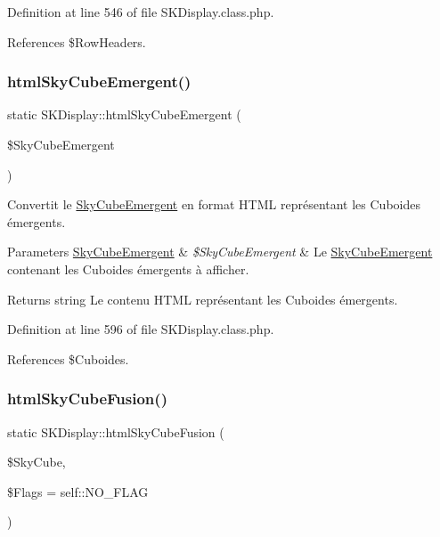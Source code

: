 Definition at line 546 of file S\+K\+Display.\+class.\+php.



References \$\+Row\+Headers.

\mbox{\label{class_s_k_display_a14e07320ee77ed55eff754b554411762}} 
\subsubsection{\texorpdfstring{html\+Sky\+Cube\+Emergent()}{htmlSkyCubeEmergent()}}
{\footnotesize\ttfamily static S\+K\+Display\+::html\+Sky\+Cube\+Emergent (\begin{DoxyParamCaption}\item[{}]{\$\+Sky\+Cube\+Emergent }\end{DoxyParamCaption})\hspace{0.3cm}{\ttfamily [static]}}

Convertit le \hyperlink{class_sky_cube_emergent}{Sky\+Cube\+Emergent} en format H\+T\+ML représentant les Cuboides émergents.


\begin{DoxyParams}[1]{Parameters}
\hyperlink{class_sky_cube_emergent}{Sky\+Cube\+Emergent} & {\em \$\+Sky\+Cube\+Emergent} & Le \hyperlink{class_sky_cube_emergent}{Sky\+Cube\+Emergent} contenant les Cuboides émergents à afficher. \\
\hline
\end{DoxyParams}
\begin{DoxyReturn}{Returns}
string Le contenu H\+T\+ML représentant les Cuboides émergents. 
\end{DoxyReturn}


Definition at line 596 of file S\+K\+Display.\+class.\+php.



References \$\+Cuboides.

\mbox{\label{class_s_k_display_aae2627b2f50d1b58bfb0d5b7665360b0}} 
\subsubsection{\texorpdfstring{html\+Sky\+Cube\+Fusion()}{htmlSkyCubeFusion()}}
{\footnotesize\ttfamily static S\+K\+Display\+::html\+Sky\+Cube\+Fusion (\begin{DoxyParamCaption}\item[{}]{\$\+Sky\+Cube,  }\item[{}]{\$\+Flags = {\ttfamily self\+:\+:NO\+\_\+FLAG} }\end{DoxyParamCaption})\hspace{0.3cm}{\ttfamily [static]}}

